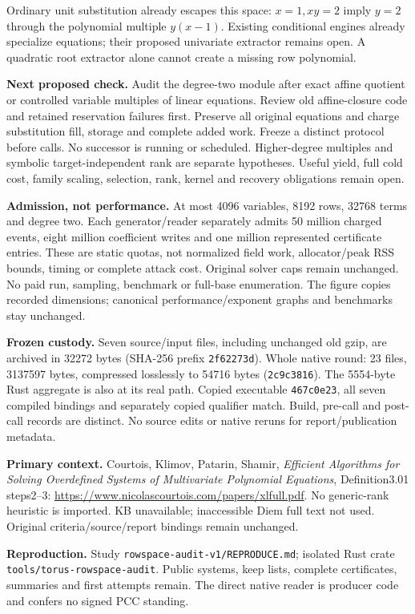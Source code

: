 \documentclass[10pt]{article}
\begin{document}
Ordinary unit substitution already escapes this space: $x=1, xy=2$ imply
$y=2$ through the polynomial multiple $y(x-1)$. Existing conditional engines
already specialize equations; their proposed univariate extractor remains
open. A quadratic root extractor alone cannot create a missing row polynomial.

\textbf{Next proposed check.} Audit the degree-two module after exact affine
quotient or controlled variable multiples of linear equations. Review old
affine-closure code and retained reservation failures first. Preserve all
original equations and charge substitution fill, storage and complete added
work. Freeze a distinct protocol before calls. No successor is running or
scheduled. Higher-degree multiples and symbolic target-independent rank are
separate hypotheses. Useful yield, full cold cost, family scaling, selection,
rank, kernel and recovery obligations remain open.

\textbf{Admission, not performance.} At most 4096 variables, 8192 rows,
32768 terms and degree two. Each generator/reader separately admits 50 million
charged events, eight million coefficient writes and one million represented
certificate entries. These are static quotas, not normalized field work,
allocator/peak RSS bounds, timing or complete attack cost. Original solver caps
remain unchanged. No paid run, sampling, benchmark or full-base enumeration.
The figure copies recorded dimensions; canonical performance/exponent graphs
and benchmarks stay unchanged.

\textbf{Frozen custody.} Seven source/input files, including unchanged old
gzip, are archived in 32272 bytes (SHA-256 prefix \texttt{2f62273d}). Whole native
round: 23 files, 3137597 bytes, compressed losslessly to 54716 bytes
(\texttt{2c9c3816}). The 5554-byte Rust aggregate is also at its real path.
Copied executable \texttt{467c0e23}, all seven compiled bindings and separately
copied qualifier match. Build, pre-call and post-call records are distinct.
No source edits or native reruns for report/publication metadata.

\textbf{Primary context.} Courtois, Klimov, Patarin, Shamir,
\emph{Efficient Algorithms for Solving Overdefined Systems of Multivariate
Polynomial Equations}, Definition3.01 steps2--3:
\url{https://www.nicolascourtois.com/papers/xlfull.pdf}.
No generic-rank heuristic is imported. KB unavailable; inaccessible Diem full
text not used. Original criteria/source/report bindings remain unchanged.

\textbf{Reproduction.} Study \texttt{rowspace-audit-v1/REPRODUCE.md}; isolated
Rust crate \texttt{tools/torus-rowspace-audit}. Public systems, keep lists,
complete certificates, summaries and first attempts remain. The direct native
reader is producer code and confers no signed PCC standing.
\end{document}
